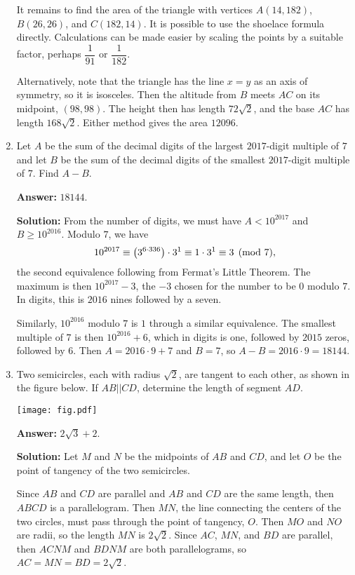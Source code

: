 \documentclass[11pt,paper=letter]{scrartcl}
\begin{document}
\begin{enumerate}[left=0pt]
It remains to find the area of the triangle with vertices $A(14, 182)$, $B(26, 26)$, and $C(182, 14)$. It is possible to use the shoelace formula directly. Calculations can be made easier by scaling the points by a suitable factor, perhaps $\dfrac1{91}$ or $\dfrac1{182}$.

Alternatively, note that the triangle has the line $x = y$ as an axis of symmetry, so it is isosceles. Then the altitude from $B$ meets $AC$ on its midpoint, $(98, 98)$. The height then has length $72\sqrt2$, and the base $AC$ has length $168\sqrt2$. Either method gives the area $12096$.

\item Let $A$ be the sum of the decimal digits of the largest $2017$-digit multiple of $7$ and let $B$ be the sum of the decimal digits of the smallest $2017$-digit multiple of $7$. Find $A-B$.

\textbf{Answer:} $\boxed{18144}$.

\textbf{Solution:} From the number of digits, we must have $A < 10^{2017}$ and $B \geq 10^{2016}$. Modulo $7$, we have $$10^{2017} \equiv \left( 3^{6\cdot336} \right)\cdot3^1 \equiv 1\cdot 3^1 \equiv 3 \pmod7,$$ the second equivalence following from Fermat's Little Theorem. The maximum is then $10^{2017} - 3$, the $-3$ chosen for the number to be $0$ modulo $7$. In digits, this is $2016$ nines followed by a seven.

Similarly, $10^{2016}$ modulo $7$ is $1$ through a similar equivalence. The smallest multiple of $7$ is then $10^{2016} + 6$, which in digits is one, followed by $2015$ zeros, followed by $6$. Then $A = 2016\cdot9 + 7$ and $B = 7$, so $A-B = 2016\cdot9 = 18144$.

\item Two semicircles, each with radius $\sqrt2$, are tangent to each other, as shown in the figure below. If $AB || CD$, determine the length of segment $AD$.

\begin{center}
  \texttt{[image: fig.pdf]}
\end{center}

\textbf{Answer:} $\boxed{2\sqrt3+2}$.

\textbf{Solution:} Let $M$ and $N$ be the midpoints of $AB$ and $CD$, and let $O$ be the point of tangency of the two semicircles.

Since $AB$ and $CD$ are parallel and $AB$ and $CD$ are the same length, then $ABCD$ is a parallelogram. Then $MN$, the line connecting the centers of the two circles, must pass through the point of tangency, $O$. Then $MO$ and $NO$ are radii, so the length $MN$ is $2\sqrt2$. Since $AC$, $MN$, and $BD$ are parallel, then $ACNM$ and $BDNM$ are both parallelograms, so $AC = MN = BD = 2\sqrt2$.


\end{enumerate}
\end{document}
